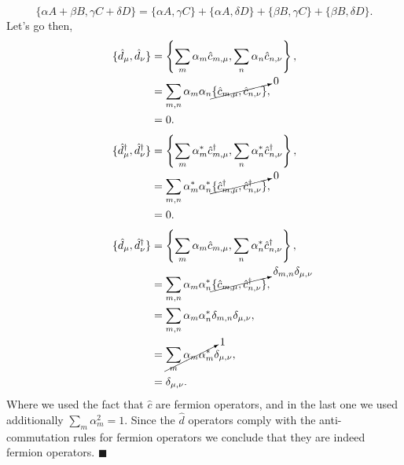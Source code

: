 \begin{questions}
\begin{solution}
  \begin{equation}
    \{\alpha A + \beta B, \gamma C + \delta D\} =   \{\alpha A, \gamma C\} +  \{\alpha A ,\delta D\} +   \{ \beta B, \gamma C \} +   \{ \beta B, \delta D\}.
    \label{linear}
  \end{equation}
  Let's go then,
  \begin{equation}
    \begin{aligned}[b]
      \{\hat{d}_\mu, \hat{d}_\nu\} &= \left\{\sum_m \alpha_m\hat{c}_{m,\mu}, \sum_n \alpha_n\hat{c}_{n,\nu}\right\},\\
      &= \sum_{m,n} \alpha_m \alpha_n \cancelto{0}{\{\hat{c}_{m,\mu},\hat{c}_{n,\nu}\}},\\
      &= 0.
    \end{aligned}
  \end{equation}
  \begin{equation}
    \begin{aligned}[b]
      \{\hat{d}^\dagger_\mu, \hat{d}^\dagger_\nu\} &= \left\{\sum_m \alpha_m^*\hat{c}^\dagger_{m,\mu}, \sum_n \alpha_n^*\hat{c}^\dagger_{n,\nu}\right\},\\
      &= \sum_{m,n} \alpha_m^* \alpha_n^* \cancelto{0}{\{\hat{c}^\dagger_{m,\mu},\hat{c}^\dagger_{n,\nu}\}},\\
      &= 0.
    \end{aligned}
  \end{equation}
  \begin{equation}
    \begin{aligned}[b]
      \{\hat{d}_\mu, \hat{d}^\dagger_\nu\} &= \left\{\sum_m \alpha_m\hat{c}_{m,\mu}, \sum_n \alpha_n^*\hat{c}^\dagger_{n,\nu}\right\},\\
      &= \sum_{m,n} \alpha_m \alpha_n^* \cancelto{\delta_{m,n}\delta_{\mu,\nu}}{\{\hat{c}_{m,\mu},\hat{c}^\dagger_{n,\nu}\}},\\
      &= \sum_{m,n} \alpha_m \alpha_n^*\delta_{m,n}\delta_{\mu,\nu},\\
      &= \cancelto{1}{\sum_{m} \alpha_m \alpha_m^*}\delta_{\mu,\nu},\\
      &= \delta_{\mu,\nu}.
    \end{aligned}
  \end{equation}
  Where we used the fact that $\hat{c}$ are fermion operators, and in the last one we used additionally $\sum_m \alpha_m^2 = 1$. Since the $\hat{d}$ operators comply with the anti-commutation rules for fermion operators we conclude that they are indeed fermion operators. $\blacksquare$
\end{solution}


\end{questions}
